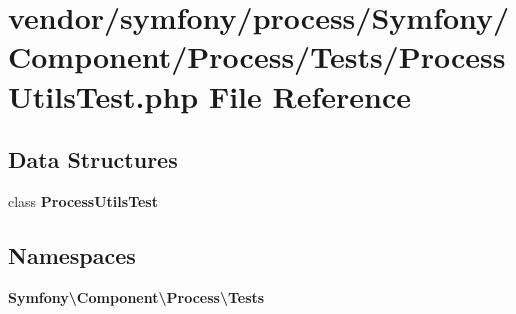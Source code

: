 \section{vendor/symfony/process/\+Symfony/\+Component/\+Process/\+Tests/\+Process\+Utils\+Test.php File Reference}
\label{_process_utils_test_8php}
\subsection*{Data Structures}
\begin{DoxyCompactItemize}
\item 
class {\bf Process\+Utils\+Test}
\end{DoxyCompactItemize}
\subsection*{Namespaces}
\begin{DoxyCompactItemize}
\item 
 {\bf Symfony\textbackslash{}\+Component\textbackslash{}\+Process\textbackslash{}\+Tests}
\end{DoxyCompactItemize}

